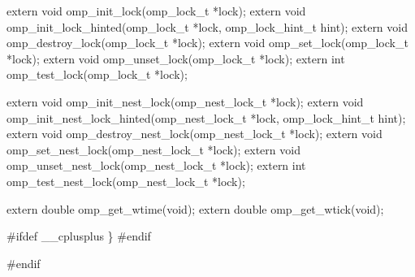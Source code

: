 {\begin{codepar}
extern void omp\_init\_lock(omp\_lock\_t *lock);
extern void omp\_init\_lock\_hinted(omp\_lock\_t *lock, omp\_lock\_hint\_t hint);
extern void omp\_destroy\_lock(omp\_lock\_t *lock);
extern void omp\_set\_lock(omp\_lock\_t *lock);
extern void omp\_unset\_lock(omp\_lock\_t *lock);
extern int omp\_test\_lock(omp\_lock\_t *lock);

extern void omp\_init\_nest\_lock(omp\_nest\_lock\_t *lock);
extern void omp\_init\_nest\_lock\_hinted(omp\_nest\_lock\_t *lock, omp\_lock\_hint\_t hint);
extern void omp\_destroy\_nest\_lock(omp\_nest\_lock\_t *lock);
extern void omp\_set\_nest\_lock(omp\_nest\_lock\_t *lock);
extern void omp\_unset\_nest\_lock(omp\_nest\_lock\_t *lock);
extern int omp\_test\_nest\_lock(omp\_nest\_lock\_t *lock);

extern double omp\_get\_wtime(void);
extern double omp\_get\_wtick(void);

\#ifdef _\_cplusplus
\}
\#endif

\#endif
\end{codepar}} %





